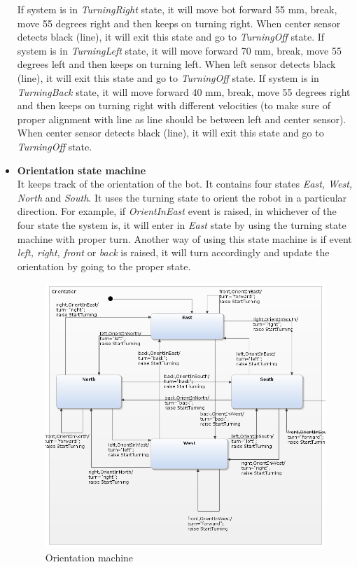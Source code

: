 \documentclass[a4paper,12pt,oneside]{book}
\begin{document}
\begin{itemize}
If system is in \textit{TurningRight} state, it will move bot forward 55 mm, break, move 55 degrees right and then keeps on turning right. When center sensor detects black (line), it will exit this state and go to \textit{TurningOff} state.
If system is in \textit{TurningLeft} state, it will move forward 70 mm, break, move 55 degrees left and then keeps on turning left. When left sensor detects black (line), it will exit this state and go to \textit{TurningOff} state.
If system is in \textit{TurningBack} state, it will move forward 40 mm, break, move 55 degrees right and then keeps on turning right with different velocities (to make sure of proper alignment with line as line should be between left and center sensor). When center sensor detects black (line), it will exit this state and go to \textit{TurningOff} state.

\item \textbf{Orientation state machine}\\
It keeps track of the orientation of the bot. It contains four states \textit{East, West, North} and \textit{South}. It uses the turning state to orient the robot in a particular direction. For example, if \textit{OrientInEast} event is raised, in whichever of the four state the system is, it will enter in \textit{East} state by using the turning state machine with proper turn. Another way of using this state machine is if event \textit{left, right, front} or \textit{back} is raised, it will turn accordingly and update the orientation by going to the proper state.
	\begin{figure}[h]
	\centering
	\includegraphics[scale=.6]{orientation.png}
	\caption{Orientation machine}
\end{figure}


\end{itemize}
\end{document}
